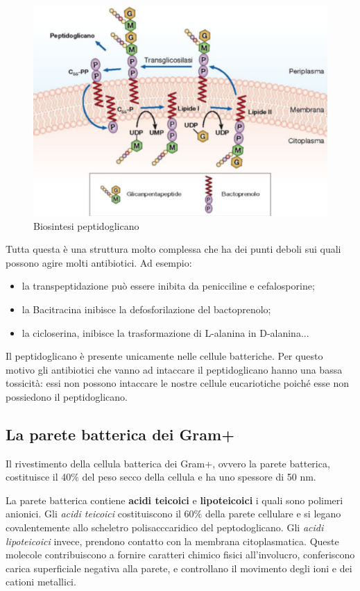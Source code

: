 \documentclass[11pt]{book}
\begin{document}
\begin{figure}[htp]
\centering
\includegraphics[scale=0.5]{img/Biosintesi peptidoglicano.png}
\caption{Biosintesi peptidoglicano}
\label{}
\end{figure}


\vspace{1em}
Tutta questa è una struttura molto complessa che ha dei punti deboli sui quali possono agire molti antibiotici. Ad esempio:
\begin{itemize}
\item la transpeptidazione può essere inibita da penicciline e cefalosporine;
\item la Bacitracina inibisce la defosforilazione del bactoprenolo;
\item la cicloserina, inibisce la trasformazione di L-alanina in D-alanina...
\end{itemize}

Il peptidoglicano è presente unicamente nelle cellule batteriche. Per questo motivo gli antibiotici che vanno ad intaccare il peptidoglicano hanno una bassa tossicità: essi non possono intaccare le nostre cellule eucariotiche poiché esse non possiedono il peptidoglicano.

\subsection{La parete batterica dei Gram+}

Il rivestimento della cellula batterica dei Gram+, ovvero la parete batterica, costituisce il 40$\%$ del peso secco della cellula e ha uno spessore di 50 nm.

La parete batterica contiene \textbf{acidi teicoici} e \textbf{lipoteicoici} i quali sono polimeri anionici. Gli \emph{acidi teicoici} costituiscono il 60$\%$ della parete cellulare e si legano covalentemente allo scheletro polisacccaridico del peptodoglicano. Gli \emph{acidi lipoteicoici} invece, prendono contatto con la membrana citoplasmatica.
Queste molecole contribuiscono a fornire caratteri chimico fisici all’involucro, conferiscono carica superficiale negativa alla parete, e controllano il movimento degli ioni e dei cationi metallici.
\end{document}
